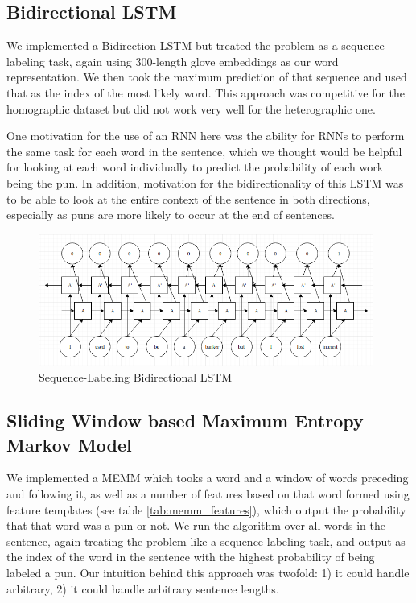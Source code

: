 \documentclass{article}
\begin{document}
\subsection{Bidirectional LSTM}

We implemented a Bidirection LSTM but treated the problem as a sequence labeling
task, again using 300-length glove embeddings as our word representation. We
then took the maximum prediction of that sequence and used that as the index of
the most likely word. This approach was competitive for the homographic dataset
but did not work very well for the heterographic one. 

One motivation for the use of an RNN here was the ability for RNNs to perform the same task for each word in the sentence, which we thought would be helpful for looking at each word individually to predict the probability of each work being the pun. In addition, motivation for the bidirectionality of this LSTM was to be able to look at the entire context of the sentence in both directions, especially as puns are more likely to occur at the end of sentences. 

\begin{figure}[h!]
	\centering
	\includegraphics[width=110mm]{figures/lstm.png}
	\caption{Sequence-Labeling Bidirectional LSTM}
	\label{fig:LSTM}
\end{figure}

\subsection{Sliding Window based Maximum Entropy Markov Model}

We implemented a MEMM which tooks a word and a window of words preceding and
following it, as well as a number of features based on that word formed using
feature templates (see table \ref{tab:memm_features}), which output the probability
that that word was a pun or not. We run the algorithm over all words in the
sentence, again treating the problem like a sequence labeling task, and output
as the index of the word in the sentence with the highest probability of being
labeled a pun. Our intuition behind this approach was twofold: 1) it could
handle arbitrary, 2) it could handle arbitrary sentence lengths. 
\end{document}
